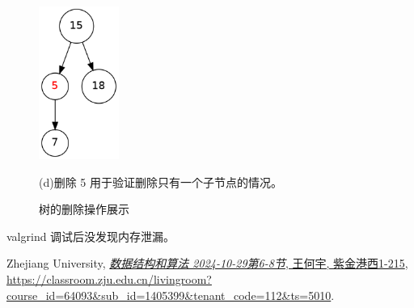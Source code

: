 \documentclass[UTF8]{ctexart}
\begin{document}
\begin{figure}[H]
\begin{minipage}[b]{0.45\textwidth}
    \end{minipage}
    \hfill
    \begin{minipage}[b]{0.45\textwidth}
        \centering
        \includegraphics[height=5cm]{./img/4.png}
        \caption*{(d)删除 5 用于验证删除只有一个子节点的情况。}
    \end{minipage}
    \caption{树的删除操作展示}
    \label{fig:remove}
\end{figure}

valgrind 调试后没发现内存泄漏。

\begin{thebibliography}{9}

Zhejiang University, 
\href{https://www.example.com}{\textit{数据结构和算法 2024-10-29第6-8节}, 
王何宇, 紫金港西1-215}, 
\url{https://classroom.zju.edu.cn/livingroom?course_id=64093&sub_id=1405399&tenant_code=112&ts=5010}.

\end{thebibliography}
\end{document}
